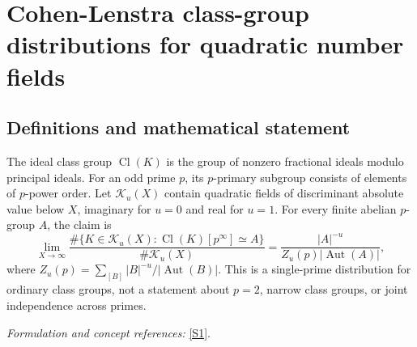 \documentclass[11pt,a4paper]{article}
\newcommand{\sref}[2]{\hyperlink{source:#1:#2}{[S#2]}}
\newif\ifshowcatalogue
\newcommand{\cataloguescope}[1]{\ifshowcatalogue
 \paragraph{Exact scope in the supplied catalogue.}
 \begin{quote}\small #1\end{quote}\fi}
\numberwithin{equation}{section}
\begin{document}
\setcounter{section}{0}
\clearpage
\section*{\texorpdfstring{Cohen-Lenstra class-group distributions for quadratic number fields}{Cohen-Lenstra class-group distributions for quadratic number fields}}\label{30006735}
\subsection{Definitions and mathematical statement}
The ideal class group $\operatorname{Cl}(K)$ is the group of nonzero fractional ideals modulo principal ideals. For an odd prime $p$, its $p$-primary subgroup consists of elements of $p$-power order. Let $\mathcal K_u(X)$ contain quadratic fields of discriminant absolute value below $X$, imaginary for $u=0$ and real for $u=1$. For every finite abelian $p$-group $A$, the claim is
\[
 \lim_{X\to\infty}\frac{\#\{K\in\mathcal K_u(X):\operatorname{Cl}(K)[p^\infty]\simeq A\}}
 {\#\mathcal K_u(X)}=\frac{|A|^{-u}}{Z_u(p)|\operatorname{Aut}(A)|},
\]
where $Z_u(p)=\sum_{[B]}|B|^{-u}/|\operatorname{Aut}(B)|$. This is a single-prime distribution for ordinary class groups, not a statement about $p=2$, narrow class groups, or joint independence across primes.
\par\smallskip\textit{Formulation and concept references:} \sref{30006735}{1}.
\cataloguescope{For u in \{0,1\} let K\_u(X) be the set of isomorphism classes of quadratic number fields K with |disc(K)| < X that are imaginary (u = 0) or real (u = 1). For each fixed odd prime p and each finite abelian p-group A, prove that the limit as X tends to infinity of \#\{K in K\_u(X) : Cl(K)[p\textasciicircum{}infinity] is isomorphic to A\} / \#K\_u(X) exists and equals (1/Z\_u(p)) * |A|\textasciicircum{}\{-u\} / |Aut(A)|, where Z\_u(p) is the sum over isomorphism classes of finite abelian p-groups B of |B|\textasciicircum{}\{-u\}/|Aut(B)| (so Z\_0(p) = prod\_\{i>=1\}(1-p\textasciicircum{}\{-i\})\textasciicircum{}\{-1\} and Z\_1(p) = prod\_\{i>=2\}(1-p\textasciicircum{}\{-i\})\textasciicircum{}\{-1\}). Cl(K) is the ordinary ideal class group and Cl(K)[p\textasciicircum{}infinity] its Sylow p-subgroup. No assertion is made for p = 2, for narrow class groups, for a joint law over several primes, or for any non-quadratic family.}
\end{document}
